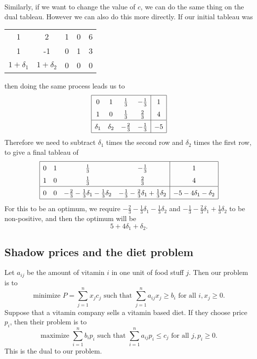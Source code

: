\documentclass[12pt]{article}
\theoremstyle{definition}
\theoremstyle{remark}
\begin{document}
Similarly, if we want to change the value of $c$, we can do the same thing on the dual tableau. However we can also do this more directly. If our initial tableau was
\begin{center}
	\begin{tabular}{|cccc|c|}
		\hline
		1 & 2 & 1 & 0 & 6 \\
		1 & -1 & 0 & 1 & 3 \\
		\hline
		$1 + \delta_1$ & $1 + \delta_2$ & 0 & 0 & 0 \\
		\hline
	\end{tabular}
\end{center}
then doing the same process leads us to
\[
\renewcommand{\arraystretch}{1.5}
\begin{array}{|cccc|c|}
	\hline
	0 & 1 & \frac{1}{3} & -\frac{1}{3} & 1 \\
	1 & 0 & \frac{1}{3} & \frac{2}{3} & 4 \\
	\hline
	\delta_1 & \delta_2 & -\frac{2}{3} & -\frac{1}{3} & -5 \\
	\hline
\end{array}
\renewcommand{\arraystretch}{1}
\]
Therefore we need to subtract $\delta_1$ times the second row and $\delta_2$ times the first row, to give a final tableau of
\[
\renewcommand{\arraystretch}{1.5}
\begin{array}{|cccc|c|}
	\hline
	0 & 1 & \frac{1}{3} & -\frac{1}{3} & 1 \\
	1 & 0 & \frac{1}{3} & \frac{2}{3} & 4 \\
	\hline
	0 & 0 & -\frac{2}{3} - \frac{1}{3}\delta_1 - \frac{1}{3}\delta_2 & -\frac{1}{3} - \frac{2}{3}\delta_1 + \frac{1}{3}\delta_2 & -5 - 4\delta_1 - \delta_2 \\
	\hline
\end{array}
\renewcommand{\arraystretch}{1}
\]
For this to be an optimum, we require $-\frac{2}{3} - \frac{1}{3}\delta_1 - \frac{1}{3}\delta_2$ and $-\frac{1}{3} - \frac{2}{3}\delta_1 + \frac{1}{3}\delta_2$ to be non-positive, and then the optimum will be 
\[
	5 + 4\delta_1 + \delta_2
.\]

\subsection{Shadow prices and the diet problem}%
\label{sub:shadow_prices_and_the_diet_problem}

Let $a_{ij}$ be the amount of vitamin $i$ in one unit of food stuff $j$. Then our problem is to
\[
	\text{minimize } P = \sum_{j = 1}^{n}x_jc_j \text{ such that } \sum_{j = 1}^{n}a_{ij}x_j \geq b_i \text{ for all } i, x_j \geq 0
.\]
Suppose that a vitamin company sells a vitamin based diet. If they choose price $p_i$, then their problem is to
\[
	\text{maximize } \sum_{i = 1}^{n}b_ip_i \text{ such that } \sum_{i = 1}^{n}a_{ij}p_i \leq c_j \text{ for all } j, p_i \geq 0
.\]
This is the dual to our problem.
\end{document}
